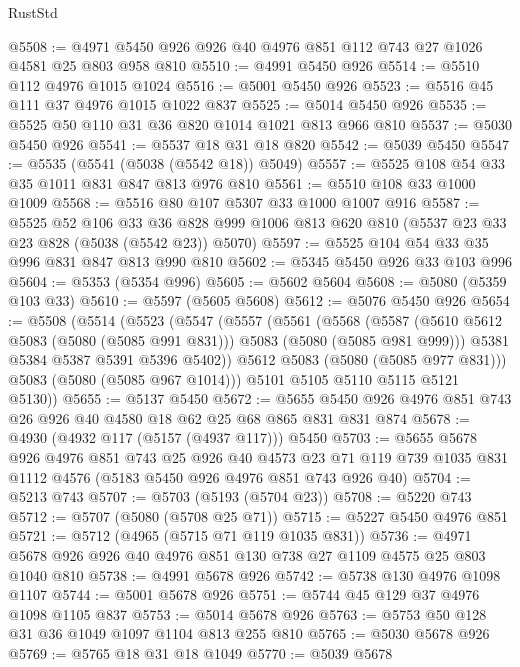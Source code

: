 \begin{lexlean}{RustStd}
\begin{coremodule}
{\begin{coremodule}
{{{{{@5508 := @4971 @5450 @926 @926 @40 @4976 @851 @112 @743 @27 @1026 @4581 @25 @803 @958 @810
@5510 := @4991 @5450 @926
@5514 := @5510 @112 @4976 @1015 @1024
@5516 := @5001 @5450 @926
@5523 := @5516 @45 @111 @37 @4976 @1015 @1022 @837
@5525 := @5014 @5450 @926
@5535 := @5525 @50 @110 @31 @36 @820 @1014 @1021 @813 @966 @810
@5537 := @5030 @5450 @926
@5541 := @5537 @18 @31 @18 @820
@5542 := @5039 @5450
@5547 := @5535 (@5541 (@5038 (@5542 @18)) @5049)
@5557 := @5525 @108 @54 @33 @35 @1011 @831 @847 @813 @976 @810
@5561 := @5510 @108 @33 @1000 @1009
@5568 := @5516 @80 @107 @5307 @33 @1000 @1007 @916
@5587 := @5525
    @52
    @106
    @33
    @36
    @828
    @999
    @1006
    @813
    @620
    @810
    (@5537 @23 @33 @23 @828 (@5038 (@5542 @23)) @5070)
@5597 := @5525 @104 @54 @33 @35 @996 @831 @847 @813 @990 @810
@5602 := @5345 @5450 @926 @33 @103 @996
@5604 := @5353 (@5354 @996)
@5605 := @5602 @5604
@5608 := @5080 (@5359 @103 @33)
@5610 := @5597 (@5605 @5608)
@5612 := @5076 @5450 @926
@5654 := @5508
    (@5514
      (@5523
        (@5547
          (@5557
            (@5561
              (@5568
                (@5587
                  (@5610 @5612 @5083 (@5080 (@5085 @991 @831)))
                  @5083
                  (@5080 (@5085 @981 @999)))
                @5381
                @5384
                @5387
                @5391
                @5396
                @5402))
            @5612
            @5083
            (@5080 (@5085 @977 @831)))
          @5083
          (@5080 (@5085 @967 @1014)))
        @5101
        @5105
        @5110
        @5115
        @5121
        @5130))
@5655 := @5137 @5450
@5672 := @5655 @5450 @926 @4976 @851 @743 @26 @926 @40 @4580 @18 @62 @25 @68 @865 @831 @831 @874
@5678 := @4930 (@4932 @117 (@5157 (@4937 @117))) @5450
@5703 := @5655
    @5678
    @926
    @4976
    @851
    @743
    @25
    @926
    @40
    @4573
    @23
    @71
    @119
    @739
    @1035
    @831
    @1112
    @4576
    (@5183 @5450 @926 @4976 @851 @743 @926 @40)
@5704 := @5213 @743
@5707 := @5703 (@5193 (@5704 @23))
@5708 := @5220 @743
@5712 := @5707 (@5080 (@5708 @25 @71))
@5715 := @5227 @5450 @4976 @851
@5721 := @5712 (@4965 (@5715 @71 @119 @1035 @831))
@5736 := @4971 @5678 @926 @926 @40 @4976 @851 @130 @738 @27 @1109 @4575 @25 @803 @1040 @810
@5738 := @4991 @5678 @926
@5742 := @5738 @130 @4976 @1098 @1107
@5744 := @5001 @5678 @926
@5751 := @5744 @45 @129 @37 @4976 @1098 @1105 @837
@5753 := @5014 @5678 @926
@5763 := @5753 @50 @128 @31 @36 @1049 @1097 @1104 @813 @255 @810
@5765 := @5030 @5678 @926
@5769 := @5765 @18 @31 @18 @1049
@5770 := @5039 @5678
}}}}}
\end{coremodule}}
\end{coremodule}
\end{lexlean}
